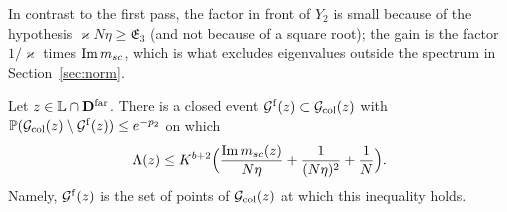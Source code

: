 \noindent In contrast to the first pass, the factor in front of $Y_2$ is small because of the hypothesis $\varkappa N\eta\ge\mathfrak E_3$ (and not because of a square root); the gain is the factor $1/\varkappa$ times $\operatorname{Im}m_{sc}$, which is what excludes eigenvalues outside the spectrum in Section~\ref{sec:norm}.

\begin{proposition}\label{prop:S4}
Let $z\in\mathbb L\cap\mathbf{D}^{\rm far}$. There is a closed event $\mathcal{G}^{\rm f}(z)\subset\mathcal{G}_{\rm col}(z)$ with $\mathbb{P}(\mathcal{G}_{\rm col}(z)\setminus\mathcal{G}^{\rm f}(z))\le e^{-p_2}$ on which
\[
 \Lambda(z)\le K^{b+2}\Big(\frac{\operatorname{Im}m_{sc}(z)}{N\eta}+\frac1{(N\eta)^2}+\frac1N\Big).
\]
Namely, $\mathcal{G}^{\rm f}(z)$ is the set of points of $\mathcal{G}_{\rm col}(z)$ at which this inequality holds.
\end{proposition}
